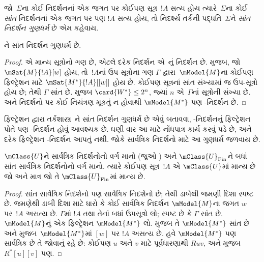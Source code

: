 \begin{defn}
  જો~$\Sigma$ના કોઈ નિદર્શનનાં એક જગત પર કોઈપણ સૂત્ર~$!A$ સત્ય હોય
  ત્યારે~$\Sigma$ના કોઈ \emph{સાંત} નિદર્શનનાં એક જગત પર પણ $!A$
  સત્ય હોય, તો નિદર્શ્ય તર્કની પદ્ધતિ~$\Sigma$ને \emph{સાંત
    નિદર્શન ગુણધર્મ} છે એમ કહેવાય.
\end{defn}

\begin{prop}
  ને સાંત નિદર્શન ગુણધર્મ છે.
\end{prop}

\begin{proof}
   એ માન્ય સૂત્રોનો ગણ છે, એટલે દરેક નિદર્શન
  એ~નું નિદર્શન છે.  મુજબ,
  જો $\mSat{M}{!A}[w]$ હોય, તો~$!A$નાં ઉપ-સૂત્રોના ગણ
  $\Gamma$ દ્વારા~$\mModel{M}$ના કોઈપણ ફિલ્ટ્રેશન માટે
  $\mSat{M^*}{!A}[{[w]}]$ હોય છે.
  કોઈપણ સૂત્રનાં સાંત સંખ્યામાં જ ઉપ-સૂત્રો હોય છે;
  તેથી $\Gamma$ સાંત છે.  મુજબ
  $\card{W^*} \le 2^n$, જ્યાં $n$ એ~$\Gamma$નાં
  સૂત્રોની સંખ્યા છે. અને  નિદર્શનો પર કોઈ નિયંત્રણ
  મૂકતું ન હોવાથી $\mModel{M^*}$ પણ -નિદર્શન છે.
\end{proof}

ફિલ્ટ્રેશન દ્વારા તર્કશાસ્ત્ર~ને સાંત નિદર્શન ગુણધર્મ છે એવું
બતાવવા, -નિદર્શનનું ફિલ્ટ્રેશન પોતે પણ -નિદર્શન
હોવું આવશ્યક છે. ઘણી વાર આ માટે નોંધપાત્ર કાર્ય કરવું પડે છે, અને
દરેક ફિલ્ટ્રેશન -નિદર્શન આપતું નથી. જોકે સાર્વત્રિક
નિદર્શનો માટે આ ગુણધર્મ જળવાય છે.

\begin{prop}
  $\mClass{U}$ને સાર્વત્રિક નિદર્શનોનો વર્ગ માનો
  (જુઓ ) અને
  $\mClass{U}_\mathrm{Fin}$ને બધાં સાંત સાર્વત્રિક નિદર્શનોનો વર્ગ
  માનો. ત્યારે કોઈપણ સૂત્ર~$!A$ એ $\mClass{U}$માં માન્ય છે
  જો અને માત્ર જો તે $\mClass{U}_\mathrm{Fin}$માં માન્ય છે.
\end{prop}

\begin{proof}
  સાંત સાર્વત્રિક નિદર્શનો પણ સાર્વત્રિક નિદર્શનો છે; તેથી
  ડાબેથી જમણી દિશા સ્પષ્ટ છે. જમણેથી ડાબી દિશા માટે ધારો કે કોઈ
  સાર્વત્રિક નિદર્શન $\mModel{M}$ના જગત $w$ પર~$!A$ અસત્ય છે.
  $\Gamma$માં $!A$ તથા તેનાં બધાં ઉપસૂત્રો લો; સ્પષ્ટ છે કે
  $\Gamma$ સાંત છે. $\mModel{M}$નું એક ફિલ્ટ્રેશન
  $\mModel{M^*}$ લો.  મુજબ તે
  $\mModel{M^*}$ સાંત છે અને  મુજબ~$\mModel{M^*}$માં
  $[w]$ પર $!A$ અસત્ય છે. હવે $\mModel{M^*}$ પણ સાર્વત્રિક છે
  તે જોવાનું રહે છે: કોઈપણ $u$ અને $v$ માટે પૂર્વધારણાથી $Ruv$,
  અને %
   મુજબ $R^*[u][v]$ પણ.
\end{proof}

